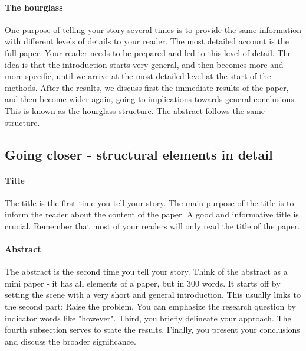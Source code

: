 \documentclass{tufte-book}
\begin{document}
\paragraph{The hourglass} One purpose of telling your story several times is to provide the same information with different levels of details to your reader. The most detailed account is the full paper. Your reader needs to be prepared and led to this level of detail. The idea is that the introduction starts very general, and then becomes more and more specific, until we arrive at the most detailed level at the start of the methods. After the results, we discuss first the immediate results of the paper, and then become wider again, going to implications towards general conclusions. This is known as the hourglass structure. The abstract follows the same structure.

\subsection{Going closer - structural elements in detail}

\paragraph{Title} The title is the first time you tell your story. The main purpose of the title is to inform the reader about the content of the paper. A good and informative title is crucial. Remember that most of your readers will only read the title of the paper.

\paragraph{Abstract}The abstract is the second time you tell your story. Think of the abstract as a mini paper - it has all elements of a paper, but in 300 words. It starts off by setting the scene with a very short and general introduction. This usually links to the second part: Raise the problem. You can emphasize the research question by indicator words like "however". Third, you briefly delineate your approach. The fourth subsection serves to state the results. Finally, you present your conclusions and discuss the broader significance.\\
\end{document}
